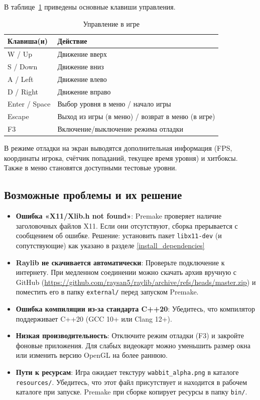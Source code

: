 \documentclass[../main.tex]{subfiles}
\begin{document}
В таблице~\ref{tab:controls_game} приведены основные клавиши управления.

\begin{table}[H]
	\centering
	\caption{Управление в игре}
	\label{tab:controls_game}
	\begin{tabularx}{\textwidth}{|l|X|}
		\hline
		\textbf{Клавиша(и)} & \textbf{Действие} \\
		\hline
		W / Up & Движение вверх \\
		\hline
		S / Down & Движение вниз \\
		\hline
		A / Left & Движение влево \\
		\hline
		D / Right & Движение вправо \\
		\hline
		Enter / Space & Выбор уровня в меню / начало игры \\
		\hline
		Escape & Выход из игры (в меню) / возврат в меню (в игре) \\
		\hline
		F3 & Включение/выключение режима отладки \\
		\hline
	\end{tabularx}
\end{table}

В режиме отладки на экран выводятся дополнительная информация (FPS, координаты игрока, счётчик попаданий, текущее время уровня) и хитбоксы. Также в меню становятся доступными тестовые уровни.

\subsection{Возможные проблемы и их решение}

\begin{itemize}
	\item \textbf{Ошибка «X11/Xlib.h not found»}: Premake проверяет наличие заголовочных файлов X11. Если они отсутствуют, сборка прерывается с сообщением об ошибке. Решение: установить пакет \texttt{libx11-dev} (и сопутствующие) как указано в разделе \ref{install_dependencies}
	
	\item \textbf{Raylib не скачивается автоматически}: Проверьте подключение к интернету. При медленном соединении можно скачать архив вручную с GitHub (\url{https://github.com/raysan5/raylib/archive/refs/heads/master.zip}) и поместить его в папку \texttt{external/} перед запуском Premake.
	
	\item \textbf{Ошибка компиляции из-за стандарта C++20}: Убедитесь, что компилятор поддерживает C++20 (GCC 10+ или Clang 12+).
	
	\item \textbf{Низкая производительность}: Отключите режим отладки (F3) и закройте фоновые приложения. Для слабых видеокарт можно уменьшить размер окна или изменить версию OpenGL на более раннюю.
	
	\item \textbf{Пути к ресурсам}: Игра ожидает текстуру \texttt{wabbit\_alpha.png} в каталоге \texttt{resources/}. Убедитесь, что этот файл присутствует и находится в рабочем каталоге при запуске. Premake при сборке копирует ресурсы в папку \texttt{bin/}.
\end{itemize}
\end{document}
